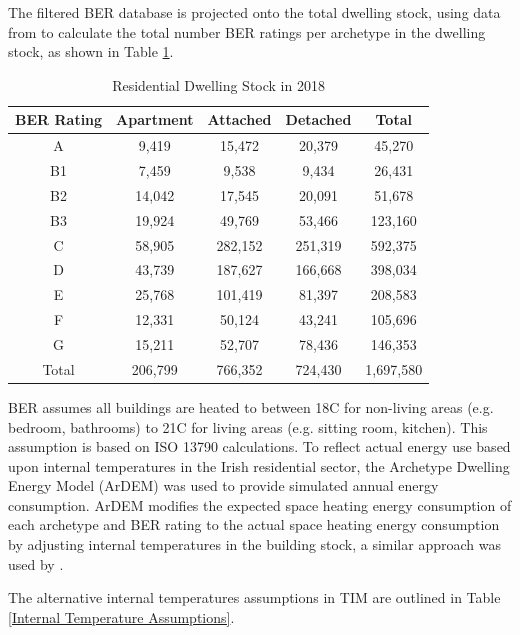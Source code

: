 \documentclass[gmd,manuscript]{copernicus}
\begin{document}
The filtered BER database is projected onto the total dwelling stock, using data from \citet{CSO2020E1008, CSO2020E1055} to calculate the total number BER ratings per archetype in the dwelling stock, as shown in Table \ref{Residential Dwelling Stock}. 

\begin{table}[ht]
 \centering
 \footnotesize
 \caption{Residential Dwelling Stock in 2018}
 \begin{tabular}{ccccc}
 \hline 
 BER Rating & Apartment & Attached & Detached & Total \\ 
 \hline
 A & 9,419 &	15,472 &	20,379 &	45,270 \\
 B1 & 7,459 &	9,538 &	9,434 &	26,431 \\
 B2	& 14,042 &	17,545 &	20,091 &	51,678 \\
 B3 & 19,924 &	49,769 &	53,466 &	123,160 \\
 C & 58,905	& 282,152 &	251,319	& 592,375 \\
 D & 43,739 &	187,627 &	166,668	& 398,034 \\
 E & 25,768 &	101,419 & 	81,397 & 	208,583 \\
 F & 12,331 &	50,124 &	43,241 &	105,696 \\
 G & 15,211 &	52,707 &	78,436 &	146,353 \\
 Total & 206,799 &	766,352	& 724,430 &	1,697,580 \\ \hline 
 \end{tabular}
 \label{Residential Dwelling Stock}
\end{table}

BER assumes all buildings are heated to between 18\textdegree C for non-living areas (e.g. bedroom, bathrooms) to 21\textdegree C for living areas (e.g. sitting room, kitchen). This assumption is based on ISO 13790 calculations. To reflect actual energy use based upon internal temperatures in the Irish residential sector, the Archetype Dwelling Energy Model (ArDEM) \citep{Dineen2015} was used to provide simulated annual energy consumption. ArDEM modifies the expected space heating energy consumption of each archetype and BER rating to the actual space heating energy consumption by adjusting internal temperatures in the building stock, a similar approach was used by \citet{Uidhir2020}.

The alternative internal temperatures assumptions in TIM are outlined in Table \ref{Internal Temperature Assumptions}. 
\end{document}
